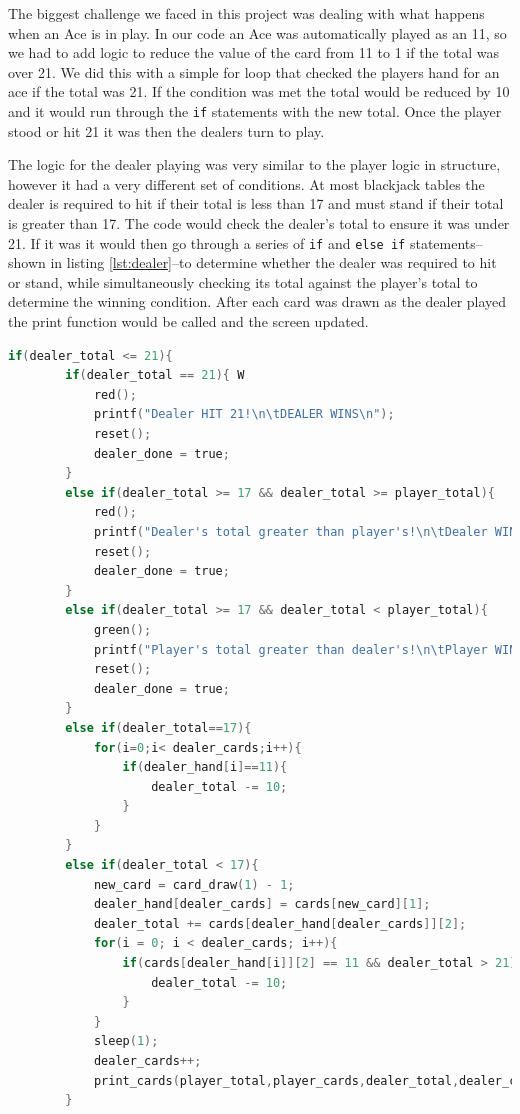 \documentclass[12pt]{article}
\begin{document}
The biggest challenge we faced in this project was dealing with what happens when an Ace is in play. In our code an Ace was automatically played as an 11, so we had to add logic to reduce the value of the card from 11 to 1 if the total was over 21. We did this with a simple for loop that checked the players hand for an ace if the total was 21. If the condition was met the total would be reduced by 10 and it would run through the \texttt{if} statements with the new total. Once the player stood or hit 21 it was then the dealers turn to play.

The logic for the dealer playing was very similar to the player logic in structure, however it had a very different set of conditions. At most blackjack tables the dealer is required to hit if their total is less than 17 and must stand if their total is greater than 17. The code would check the dealer's total to ensure it was under 21. If it was it would then go through a series of \texttt{if} and \texttt{else if} statements--shown in listing \ref{lst:dealer}--to determine whether the dealer was required to hit or stand, while simultaneously checking its total against the player's total to determine the winning condition. After each card was drawn as the dealer played the print function would be called and the screen updated.
\begin{lstlisting}[language = C, caption = Dealer Choice Logic, label = {lst:dealer}]
if(dealer_total <= 21){
        if(dealer_total == 21){ W
            red();
            printf("Dealer HIT 21!\n\tDEALER WINS\n");
            reset();
            dealer_done = true;
        }
        else if(dealer_total >= 17 && dealer_total >= player_total){
            red();
            printf("Dealer's total greater than player's!\n\tDealer WINS\n");
            reset();
            dealer_done = true;
        }
        else if(dealer_total >= 17 && dealer_total < player_total){
            green();
            printf("Player's total greater than dealer's!\n\tPlayer WINS\n");
            reset();
            dealer_done = true;
        }
        else if(dealer_total==17){
            for(i=0;i< dealer_cards;i++){
                if(dealer_hand[i]==11){
                    dealer_total -= 10;
                }
            }
        }
	    else if(dealer_total < 17){
	      	new_card = card_draw(1) - 1;
		    dealer_hand[dealer_cards] = cards[new_card][1];
		    dealer_total += cards[dealer_hand[dealer_cards]][2];
            for(i = 0; i < dealer_cards; i++){
                if(cards[dealer_hand[i]][2] == 11 && dealer_total > 21){
                    dealer_total -= 10;
                }
            }
            sleep(1);
		    dealer_cards++;
		    print_cards(player_total,player_cards,dealer_total,dealer_cards,player_done,current_count);
	    }
\end{lstlisting}
\end{document}
